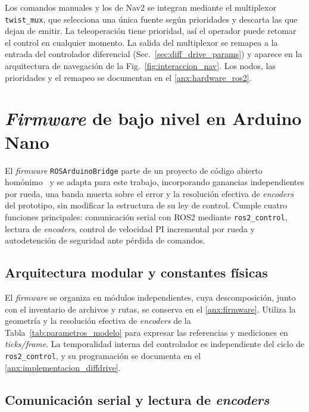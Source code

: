 Los comandos manuales y los de Nav2 se integran mediante el multiplexor
\texttt{twist\_mux}, que selecciona una única fuente según prioridades y
descarta las que dejan de emitir. La teleoperación tiene prioridad, así el
operador puede retomar el control en cualquier momento. La salida del
multiplexor se remapea a la entrada del controlador diferencial
(Sec.~\ref{sec:diff_drive_params}) y aparece en la arquitectura de navegación
de la Fig.~\ref{fig:interaccion_nav}. Los nodos, las prioridades y el remapeo
se documentan en el \ref{anx:hardware_ros2}.

\section{\texorpdfstring{\textit{Firmware}}{Firmware} de bajo nivel en Arduino Nano}
\label{ch:setup_arduino}

El \textit{firmware} \texttt{ROSArduinoBridge} parte de un proyecto de código abierto homónimo~\citep{newans_rosarduinobridge} y se adapta para este trabajo, incorporando ganancias independientes por rueda, una banda muerta sobre el error y la resolución efectiva de \textit{encoders} del prototipo, sin modificar la estructura de su ley de control. Cumple cuatro funciones principales: comunicación serial con \gls{ROS2} mediante \texttt{ros2\_control}, lectura de \textit{encoders}, control de velocidad PI incremental por rueda y autodetención de seguridad ante pérdida de comandos.

\subsection{Arquitectura modular y constantes físicas}

El \textit{firmware} se organiza en módulos independientes, cuya descomposición, junto
con el inventario de archivos y rutas, se conserva en el \ref{anx:firmware}.
Utiliza la geometría y la resolución efectiva de \textit{encoders} de la
Tabla~\ref{tab:parametros_modelo} para expresar las referencias y mediciones en
\textit{ticks/frame}. La temporalidad interna del controlador es independiente
del ciclo de \texttt{ros2\_control}, y su programación se documenta en el
\ref{anx:implementacion_diffdrive}.

\subsection{Comunicación serial y lectura de \texorpdfstring{\textit{encoders}}{encoders}}
\label{sec:serial_firmware}

